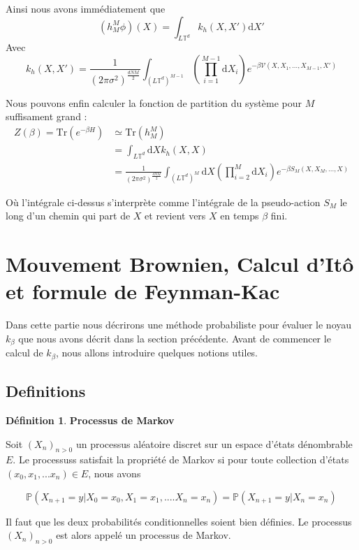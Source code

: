 \documentclass[11pt]{article}
\theoremstyle{definition}
\newtheorem{definition}{Définition}[section]
\theoremstyle{remark}
\newcommand{\dom}{L\mathbb{T}^d}
\begin{document}
Ainsi nous avons immédiatement que 
\begin{equation}
(h_M^M\phi)(X)=\int_{\dom}k_h(X,X')\mathrm{d}X'
\end{equation}
Avec 
\begin{equation}
k_h(X,X')=\frac{1}{(2\pi\sigma^2)^\frac{dNM}{2}}\int_{(\dom)^{M-1}} \left(\prod_{i=1}^{M-1}\mathrm{d}X_i\right) e^{-\beta \mathcal{V}(X,X_1,\ldots,X_{M-1},X')}
\end{equation}

Nous pouvons enfin calculer la fonction de partition du système pour $M$ suffisament grand :
\begin{align*}
Z(\beta)=\mathrm{Tr}(e^{-\beta H})& \simeq \mathrm{Tr}(h_M^M)
\\
&= \int_{\dom}\mathrm{d}X k_h(X,X)
\\
&= \frac{1}{(2\pi\sigma^2)^\frac{dNM}{2}}\int_{(\dom)^{M}} \mathrm{d}X\left(\prod_{i=2}^{M}\mathrm{d}X_i\right) e^{-\beta S_M(X,X_M,\ldots,X)}
\end{align*}

Où l'intégrale ci-dessus s'interprète comme l'intégrale de la pseudo-action $S_M$ le long d'un chemin qui part de $X$ et revient vers $X$ en temps $\beta$ fini.

\section{Mouvement Brownien, Calcul d'Itô et formule de Feynman-Kac}\label{sec:brown}
Dans cette partie nous décrirons une méthode probabiliste pour évaluer le noyau $k_{\beta}$ que nous avons décrit dans la section précédente. 
Avant de commencer le calcul de $k_{\beta}$, nous allons introduire quelques notions utiles.

\subsection{Definitions}

\theoremstyle{definition}

\begin{definition}{\textbf{Processus de Markov}}

Soit $(X_n)_{n >0}$ un processus aléatoire discret sur un espace d'états dénombrable $E$. Le processuss satisfait la propriété de Markov si pour toute collection d'états $(x_0, x_1, ... x_n) \in E$, nous avons 

\begin{equation} 
\mathbb{P}(X_{n+1} = y | X_0 = x_0, X_1 = x_1,....X_n = x_n) = \mathbb{P}(X_{n+1} = y | X_n = x_n)
\end{equation}

Il faut que les deux probabilités conditionnelles soient bien définies. Le processus $(X_n)_{n>0} $ est alors appelé un processus de Markov.

\end{definition}
\end{document}
